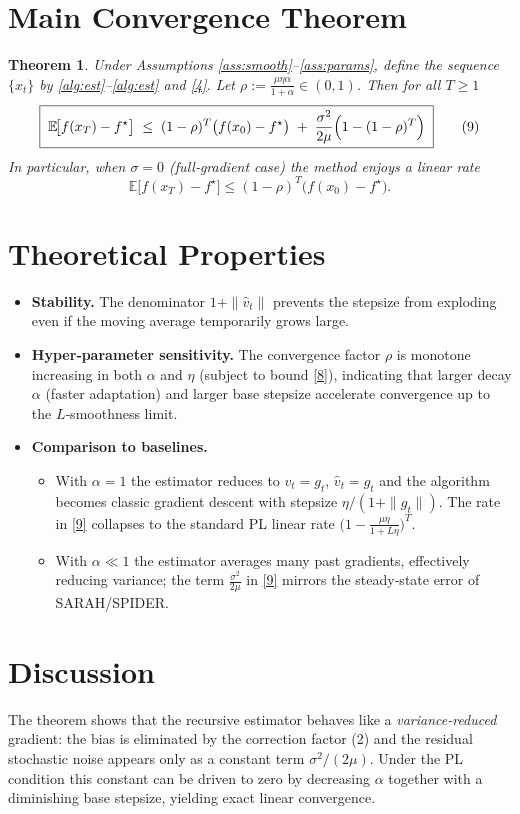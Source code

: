 \documentclass{article}
\newtheorem{theorem}{Theorem}
\newcommand{\EE}{\mathbb{E}}
\begin{document}
\section*{Main Convergence Theorem}
\begin{theorem}\label{thm:linear}
Under Assumptions \ref{ass:smooth}–\ref{ass:params}, define the sequence $\{x_t\}$ by \eqref{alg:est}–\eqref{alg:est} and \eqref{4}.  
Let $\rho:=\frac{\mu\eta\alpha}{1+\alpha}\in(0,1)$.  
Then for all $T\ge1$
\[
\boxed{\;
\EE\!\bigl[f(x_T)-f^\star\bigr]\;\le\;(1-\rho)^T\bigl(f(x_0)-f^\star\bigr)
\;+\;
\frac{\sigma^2}{2\mu}\Bigl(1-(1-\rho)^T\Bigr)
\;}
\tag{9}
\]
In particular, when $\sigma=0$ (full‑gradient case) the method enjoys a linear rate
\[
\EE\!\bigl[f(x_T)-f^\star\bigr]\le (1-\rho)^T\bigl(f(x_0)-f^\star\bigr).
\]
\end{theorem}

\section*{Theoretical Properties}
\begin{itemize}[leftmargin=*]
\item \textbf{Stability.} The denominator $1+\|\hat v_t\|$ prevents the stepsize from exploding even if the moving average temporarily grows large.
\item \textbf{Hyper‑parameter sensitivity.} The convergence factor $\rho$ is monotone increasing in both $\alpha$ and $\eta$ (subject to bound \eqref{8}), indicating that larger decay $\alpha$ (faster adaptation) and larger base stepsize accelerate convergence up to the $L$‑smoothness limit.
\item \textbf{Comparison to baselines.}
    \begin{itemize}
        \item With $\alpha=1$ the estimator reduces to $v_t=g_t$, $\hat v_t=g_t$ and the algorithm becomes classic gradient descent with stepsize $\eta/(1+\|g_t\|)$. The rate in \eqref{9} collapses to the standard PL linear rate $\bigl(1-\frac{\mu\eta}{1+L\eta}\bigr)^T$.
        \item With $\alpha\ll1$ the estimator averages many past gradients, effectively reducing variance; the term $\frac{\sigma^2}{2\mu}$ in \eqref{9} mirrors the steady‑state error of SARAH/SPIDER.
    \end{itemize}
\end{itemize}

\section*{Discussion}
The theorem shows that the recursive estimator behaves like a \emph{variance‑reduced} gradient: the bias is eliminated by the correction factor (2) and the residual stochastic noise appears only as a constant term $\sigma^2/(2\mu)$. Under the PL condition this constant can be driven to zero by decreasing $\alpha$ together with a diminishing base stepsize, yielding exact linear convergence.
\end{document}
